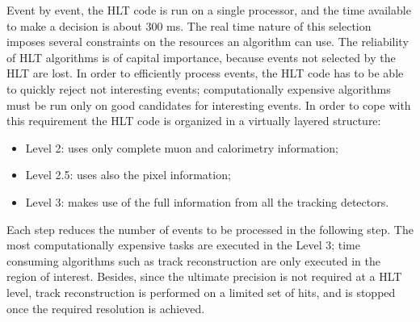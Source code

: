 Event by event, the HLT code is run on a single processor, and the time available to make a decision is about 300 ms. The real time nature of this selection imposes several constraints on the resources an algorithm can use. The reliability of HLT algorithms is of capital importance, because events not selected by the HLT are lost. In order to efficiently process events, the HLT code has to be able to quickly reject not interesting events; computationally expensive algorithms must be run only on good candidates for interesting events. In order to cope with this requirement the HLT code is organized
in a virtually layered structure:
\begin{itemize}
\item Level 2: uses only complete muon and calorimetry information;
\item Level 2.5: uses also the pixel information;
\item Level 3: makes use of the full information from all the tracking detectors.
\end{itemize}
Each step reduces the number of events to be processed in the following step. The most computationally expensive tasks are executed in the Level 3; time consuming algorithms such as track reconstruction are only executed in the region of interest. Besides, since the ultimate precision is not required at a HLT level, track reconstruction is performed on a limited set of hits, and is stopped once the required resolution is achieved.








